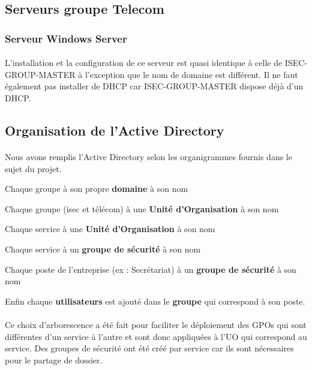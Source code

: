	\subsection{Serveurs groupe Telecom}
		\subsubsection{Serveur Windows Server}
			\paragraph{}
				L’installation et la configuration de ce serveur est quasi identique à celle de ISEC-GROUP-MASTER à l’exception que le nom de domaine est différent. Il ne faut également pas installer de DHCP car ISEC-GROUP-MASTER dispose déjà d’un DHCP.


	\subsection{Organisation de l'Active Directory}	
		\paragraph{}
			Nous avons remplis l'Active Directory selon les organigrammes fournis dans le sujet du projet. 

		\begin{description}
			\item Chaque groupe à son propre \textbf{domaine} à son nom
			\item Chaque groupe (isec et télécom) à une \textbf{Unité d'Organisation} à son nom
			\item Chaque service à une \textbf{Unité d'Organisation} à son nom
			\item Chaque service à un \textbf{groupe de sécurité} à son nom 
			\item Chaque poste de l'entreprise (ex : Secrétariat) à un \textbf{groupe de sécurité} à son nom
			\item Enfin chaque \textbf{utilisateurs} est ajouté dans le \textbf{groupe} qui correspond à son poste. 
		\end{description}

		\paragraph{}
			Ce choix d'arborescence a été fait pour faciliter le déploiement des GPOs qui sont différentes d'un service à l'autre et sont donc appliquées à l'UO qui correspond au service. Des groupes de sécurité ont été créé par service car ils sont nécessaires pour le partage de dossier. 

